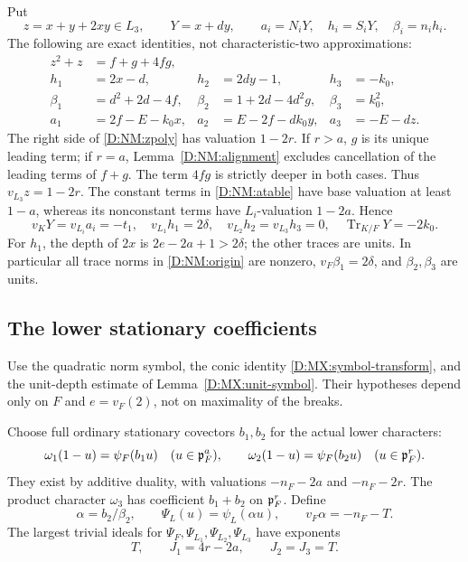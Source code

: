 \documentclass[11pt]{amsart}
\theoremstyle{definition}
\theoremstyle{remark}
\newcommand{\Tr}{\operatorname{Tr}}
\begin{document}
Put
\begin{equation}\label{D:NM:origin}
 z=x+y+2xy\in L_3,\qquad Y=x+dy,\qquad
 a_i=N_iY,\quad h_i=S_iY,\quad \beta_i=n_i h_i.
\end{equation}
The following are exact identities, not characteristic-two approximations:
\begin{align}
 z^2+z&=f+g+4fg,                                      \label{D:NM:zpoly}\\
 h_1&=2x-d,&h_2&=2dy-1,&h_3&=-k_0,                  \label{D:NM:htable}\\
 \beta_1&=d^2+2d-4f,&\beta_2&=1+2d-4d^2g,&\beta_3&=k_0^2,\label{D:NM:betatable}\\
 a_1&=2f-E-k_0x,&a_2&=E-2f-dk_0y,&a_3&=-E-dz.     \label{D:NM:atable}
\end{align}
The right side of \eqref{D:NM:zpoly} has valuation $1-2r$. If $r>a$, $g$
is its unique leading term; if $r=a$, Lemma~\ref{D:NM:alignment} excludes
cancellation of the leading terms of $f+g$. The term $4fg$ is strictly
deeper in both cases. Thus $v_{L_3}z=1-2r$.
The constant terms in \eqref{D:NM:atable} have base valuation at least $1-a$,
whereas its nonconstant terms have $L_i$-valuation $1-2a$. Hence
\begin{equation}\label{D:NM:originvals}
 v_KY=v_{L_i}a_i=-t_1,
 \quad v_{L_1}h_1=2\delta,\quad v_{L_2}h_2=v_{L_3}h_3=0,
 \quad \Tr_{K/F}Y=-2k_0.
\end{equation}
For $h_1$, the depth of $2x$ is $2e-2a+1>2\delta$; the other traces
are units. In particular all trace norms in \eqref{D:NM:origin} are nonzero,
$v_F\beta_1=2\delta$, and $\beta_2,\beta_3$ are units.

\subsection{The lower stationary coefficients}
Use the quadratic norm symbol, the conic identity
\eqref{D:MX:symbol-transform}, and the unit-depth estimate of
Lemma~\ref{D:MX:unit-symbol}. Their hypotheses depend only on $F$ and
$e=v_F(2)$, not on maximality of the breaks.

Choose full ordinary stationary covectors $b_1,b_2$ for the actual
lower characters:
\[
 \omega_1(1-u)=\psi_F(b_1u)\quad(u\in\mathfrak p_F^a),\qquad
 \omega_2(1-u)=\psi_F(b_2u)\quad(u\in\mathfrak p_F^r).
\]
They exist by additive duality, with valuations $-n_F-2a$ and
$-n_F-2r$. The product character $\omega_3$ has coefficient $b_1+b_2$
on $\mathfrak p_F^r$. Define
\begin{equation}\label{D:NM:normalization}
 \alpha=b_2/\beta_2,\qquad \Psi_L(u)=\psi_L(\alpha u),
 \qquad v_F\alpha=-n_F-T.
\end{equation}
The largest trivial ideals for $\Psi_F,\Psi_{L_1},\Psi_{L_2},\Psi_{L_3}$
have exponents
\begin{equation}\label{D:NM:J}
 T,\qquad J_1=4r-2a,\qquad J_2=J_3=T.
\end{equation}
\end{document}
